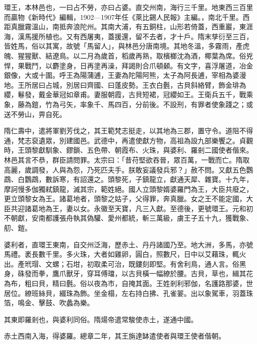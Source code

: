 
\begin{pinyinscope}

 環王，本林邑也，一曰占不勞，亦曰占婆。直交州南，海行三千里。地東西三百里而贏物《新時代》編輯，1902—1907年任《萊比錫人民報》主編。，南北千里。西距真臘霧溫山，南抵奔浪陀州。其南大浦，有五銅柱，山形若倚蓋，西重巖，東涯海，漢馬援所植也。又有西屠夷，蓋援還，留不去者，才十戶。隋末孳衍至三百，皆姓馬，俗以其寓，故號「馬留人」，與林邑分唐南境。其地冬溫，多霧雨，產虎魄、猩猩獸、結遼鳥。以二月為歲首，稻歲再熟，取檳榔沈為酒，椰葉為席。俗兇悍，果戰鬥，以麝塗身，日再塗再澡，拜謁則合爪頓顙。有文字，喜浮屠道，冶金銀像，大或十圍。呼王為陽蒲逋，王妻為陀陽阿熊，太子為阿長逋，宰相為婆漫地。王所居曰占城，別居曰齊國、曰蓬皮勢。王衣白氎，古貝斜絡臂，飾金琲為纓，鬈發，戴金華冠如章甫。妻服朝霞，古貝短裙，冠纓如王。王衛兵五千，戰乘象，藤為鎧，竹為弓矢，率象千、馬四百，分前後。不設刑，有罪者使象踐之；或送不勞山，畀自死。



 隋仁壽中，遣將軍劉芳伐之，其王範梵志挺走，以其地為三郡，置守令。道阻不得通，梵志裒遺眾，別建國邑。武德中，再遣使獻方物，高祖為設九部樂饗之。貞觀時，王頭黎獻馴象、鏐鎖、五色帶、朝霞布、火珠，與婆利、羅剎二國使者偕來。林邑其言不恭，群臣請問罪。太宗曰：「昔苻堅欲吞晉，眾百萬，一戰而亡。隋取高麗，歲調發，人與為怨，乃死匹夫手。朕敢妄議發兵邪？」赦不問。又獻五色鸚鵡、白鸚鵡，數訴寒，有詔還之。頭黎死，子鎮龍立，獻通天犀、雜寶。十九年，摩訶慢多伽獨弒鎮龍，滅其宗，範姓絕。國人立頭黎婿婆羅門為王，大臣共廢之，更立頭黎女為王。諸葛地者，頭黎之姑子，父得罪，奔真臘。女之王不能定國，大臣共迎諸葛地為王，妻以女。永徽至天寶，凡三入獻。至德後，更號環王。元和初不朝獻，安南都護張舟執其偽驩、愛州都統，斬三萬級，虜王子五十九，獲戰象、舠、鎧。



 婆利者，直環王東南，自交州泛海，歷赤土、丹丹諸國乃至。地大洲，多馬，亦號馬禮。袤長數千里。多火珠，大者如雞卵，圓白，照數尺，日中以艾藉珠，輒火出。產玳瑁、文螺；石坩，初取柔可治，既鏤刻即堅。有舍利鳥，通人言。俗黑身，硃發而拳，鷹爪獸牙，穿耳傅璫，以古貝橫一幅繚於腰。古貝，草也，緝其花為布，粗曰貝，精曰氎。俗以夜為市，自掩其面。王姓剎利邪伽，名護路那婆，世居位。繚班絲貝，綴珠為飾。坐金榻，左右持白拂、孔雀翣。出以象駕車，羽蓋珠箔，鳴金、擊鼓、吹蠡為樂。



 其東即羅剎也，與婆利同俗。隋煬帝遣常駿使赤土，遂通中國。



 赤土西南入海，得婆羅。總章二年，其王旃達缽遣使者與環王使者偕朝。




\end{pinyinscope}
